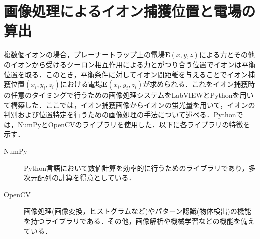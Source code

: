 \section{画像処理によるイオン捕獲位置と電場の算出}
複数個イオンの場合，プレーナートラップ上の電場$\bm{E}(x,y,z)$による力とその他のイオンから受けるクーロン相互作用による力とがつり合う位置でイオンは平衡位置を取る．このとき，平衡条件に対してイオン間距離を与えることでイオン捕獲位置$(x_i,y_i,z_i)$における電場$\bm{E}(x_i,y_i,z_i)$が求められる．これをイオン捕獲時の任意のタイミングで行うための画像処理システムをLabVIEWとPythonを用いて構築した．ここでは，イオン捕獲画像からイオンの蛍光量を用いて，イオンの判別および位置特定を行うための画像処理の手法について述べる．Pythonでは，NumPyとOpenCVのライブラリを使用した．以下に各ライブラリの特徴を示す．
\begin{description}
\item[NumPy] Python言語において数値計算を効率的に行うためのライブラリであり，多次元配列の計算を得意としている．
\item[OpenCV] 画像処理(画像変換，ヒストグラムなど)やパターン認識(物体検出)の機能を持つライブラリである．その他，画像解析や機械学習などの機能を備えている．
\end{description}
